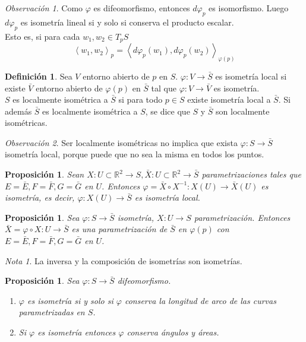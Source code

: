 \documentclass{report}
\newtheorem{proposition}[theorem]{Proposición}
\theoremstyle{remark}
\newtheorem*{remark}{Observación}
\theoremstyle{remark}
\newtheorem*{note}{Nota}
\theoremstyle{definition}
\newtheorem{definition}{Definición}[chapter]
\theoremstyle{definition}
\theoremstyle{definition}
\begin{document}
\begin{remark}
    Como $\varphi$ es difeomorfismo, entonces $d\varphi_p$ es isomorfismo.
    Luego $d\varphi_p$ es isometría lineal si y solo si conserva el producto escalar.\\
    Esto es, si para cada $w_1, w_2 \in T_pS$
    $$\left\langle w_1, w_2 \right\rangle _p = \left\langle d\varphi_p(w_1), d\varphi_p(w_2) \right\rangle _{\varphi(p)}$$
\end{remark}

\begin{definition}
    Sea $V$ entorno abierto de $p$ en $S$.
    $\varphi : V \to \bar{S}$ es isometría local si existe $\bar{V}$ entorno abierto de $\varphi(p)$ en $\bar{S}$ tal que $\varphi : V \to \bar{V}$ es isometría.\\
    $S$ es localmente isométrica a $\bar{S}$ si para todo $p \in S$ existe isometría local a $\bar{S}$.
    Si además $\bar{S}$ es localmente isométrica a $S$, se dice que $S$ y $\bar{S}$ son localmente isométricas.
\end{definition}

\begin{remark}
    Ser localmente isométricas no implica que exista $\varphi : S \to \bar{S}$ isometría local, porque puede que no sea la misma en todos los puntos.
\end{remark}

\begin{proposition}
    Sean $X: U \subset \mathbb{R}^2 \to S, \bar{X}: U \subset \mathbb{R}^2 \to \bar{S}$ parametrizaciones tales que $E = \bar{E}, F = \bar{F}, G = \bar{G}$ en $U$.
    Entonces $\varphi = \bar{X} \circ X^{-1}: X(U) \to \bar{X}(U)$ es isometría, es decir, $\varphi: X(U) \to \bar{S}$ es isometría local.
\end{proposition}

\begin{proposition}
    Sea $\varphi: S \to \bar{S}$ isometría, $X: U \to S$ parametrización.
    Entonces $\bar{X} = \varphi \circ X: U \to \bar{S}$ es una parametrización de $\bar{S}$ en $\varphi(p)$ con $E = \bar{E}, F = \bar{F}, G = \bar{G}$ en $U$.
\end{proposition}

\begin{note}
    La inversa y la composición de isometrías son isometrías.
\end{note}

\begin{proposition}
    Sea $\varphi: S \to \bar{S}$ difeomorfismo.
    \begin{enumerate}
        \item $\varphi$ es isometría si y solo si $\varphi$ conserva la longitud de arco de las curvas parametrizadas en $S$.
        \item Si $\varphi$ es isometría entonces $\varphi$ conserva ángulos y áreas.
    \end{enumerate}
\end{proposition}
\end{document}
